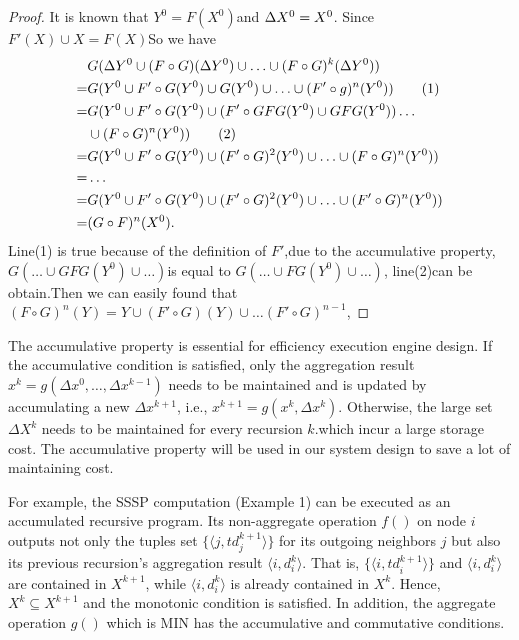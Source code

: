 \documentclass{vldb}
\begin{document}
 \begin{proof}
 	It is known that $Y^0=F(X^0)$and $\Delta X^0=X^0\\$. Since $F'(X)\cup X=F(X)$So we have
 	\begin{align}
 	&G(\Delta Y^0\cup (F\circ G)(\Delta Y^0)\cup\ldots\cup (F\circ G)^k(\Delta Y^0))\notag \\
 	=&G(Y^0\cup F'\circ G(Y^0)\cup G(Y^0)\cup \ldots \cup (F'\circ g)^n(Y^0))    \tag{1}\\
 	=&G(Y^0\cup F'\circ G(Y^0)\cup(F'\circ GFG(Y^0) \cup GFG(Y^0)) \ldots \notag \\ &\cup (F\circ G)^n(Y^0)) \tag{2}\\
 	=&G(Y^0\cup F'\circ G(Y^0)\cup (F'\circ G)^2(Y^0)\cup \ldots \cup (F\circ G)^n(Y^0))\notag\\
 	=& \ldots \notag \\
 	=&G(Y^0\cup F'\circ G(Y^0)\cup (F'\circ G)^2(Y^0)\cup \ldots \cup (F'\circ G)^n(Y^0))\notag\\
 	=&(G \circ F)^n(X^0).\notag
 	\end{align}
 	Line(1) is true because of the definition of $F'$,due to the accumulative property, $G(\ldots \cup GFG(Y^0)\cup \ldots)$is equal to $G(\ldots \cup FG(Y^0)\cup \ldots)$, line(2)can be obtain.Then we can easily found that $(F \circ G)^n(Y)=Y \cup (F'\circ G)(Y)\cup \ldots(F' \circ G)^{n-1}$,
 \end{proof}
 The accumulative property is essential for efficiency execution engine design. If the accumulative condition is satisfied, only the aggregation result $x^k=g(\Delta x^{0},\ldots,\Delta x^{k-1})$ needs to be maintained and is updated by accumulating a new $\Delta x^{k+1}$, i.e., $x^{k+1}=g(x^k,\Delta x^{k})$. Otherwise, the large set $\Delta X^{k}$ needs to be maintained for every recursion $k$.which incur a large storage cost. The accumulative property will be used in our system design to save a lot of maintaining cost.

For example, the SSSP computation (Example 1) can be executed as an accumulated recursive program. Its non-aggregate operation $f()$ on node $i$ outputs not only the tuples set $\{\langle j,td_j^{k+1}\rangle\}$ for its outgoing neighbors $j$ but also its previous recursion's aggregation result $\langle i,d_i^k\rangle$. That is, $\{\langle i,td_i^{k+1}\rangle\}$ and $\langle i,d_i^k\rangle$ are contained in $X^{k+1}$, while $\langle i,d_i^k\rangle$ is already contained in $X^{k}$. Hence, $X^{k}\subseteq X^{k+1}$ and the monotonic condition is satisfied. In addition, the aggregate operation $g()$ which is MIN has the accumulative and commutative conditions.
\end{document}
